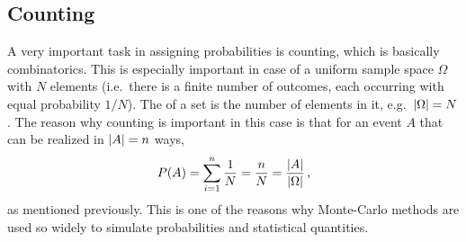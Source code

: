 \begin{table}[t]
\centering



\caption{Visual representation of the sample space of two consecutive coin flips (where a fair coin is assumed, every outcome has the same probability of $\frac{1}{4}$. As the axes labels indicate, the $x$-axis is used for results of the first flip and the $y$-axis for results of the second flip.}

\label{tab:ss_double_coinflip}
\end{table}



	\subsection{Counting}
A very important task in assigning probabilities is counting, which is basically combinatorics. This is especially important in case of a uniform sample space $\Omega$ with $N$ elements (i.e.~there is a finite number of outcomes, each occurring with equal probability $1 / N$). The  of a set is the number of elements in it, e.g.~$\abs{\Omega} = N$. The reason why counting is important in this case is that for an event $A$ that can be realized in $\abs{A} = n$ ways,
\begin{equation}
P(A) = \sum_{i = 1}^n \frac{1}{N} = \frac{n}{N} = \frac{\abs{A}}{\abs{\Omega}} \, ,
\end{equation}
as mentioned previously. This is one of the reasons why Monte-Carlo methods are used so widely to simulate probabilities and statistical quantities.


